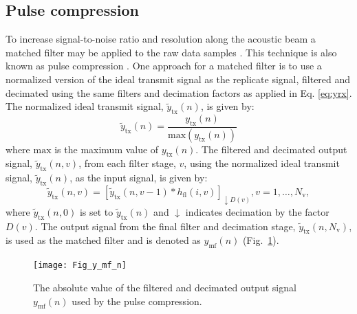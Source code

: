 \documentclass[preprint,12pt,TurnOnLineNumbers]{JASAnew}
\newcommand{\samplesymt}{n}
\newcommand{\genidxsym}{i}
\newcommand{\stagesym}{v}
\newcommand{\nstages}{N_{\textrm{v}}}
\newcommand{\ytx}{y_{\textrm{tx}}}
\newcommand{\ytxnorm}{\tilde{y}_{\textrm{tx}}}
\newcommand{\ymf}{y_{\textrm{mf}}}
\newcommand{\decfac}{D}
\newcommand{\hfl}{h_{\textrm{fl}}}
\begin{document}
\subsection{Pulse compression}
To increase signal-to-noise ratio and resolution along the acoustic beam a matched filter may be applied to the raw data samples \citep{turin1960}. This technique is also known as pulse compression \citep{klauder1960}. One approach for a matched filter is to use a normalized version of the ideal transmit signal as the replicate signal, filtered and decimated using the same filters and decimation factors as applied in Eq. \ref{eq:yrx}. The normalized ideal transmit signal, $\ytxnorm(\samplesymt)$, is given by:
%
\begin{equation}
\label{eq:ytxnorm}
\ytxnorm(\samplesymt) = \frac{\ytx(\samplesymt)}{\textrm{max}(\ytx(\samplesymt))}\end{equation}
%
where $\textrm{max}$ is the maximum value of $\ytx(\samplesymt)$. The filtered and decimated output signal, $\ytxnorm(\samplesymt,\stagesym)$, from each filter stage, $\stagesym$, using the normalized ideal transmit signal, $\ytxnorm(\samplesymt)$, as the input signal, is given by:
%
\begin{equation}
\label{eq:FilterStagesTX}
\ytxnorm(\samplesymt,\stagesym) = \left[ \ytxnorm(\samplesymt,\stagesym-1) * \hfl(\genidxsym,\stagesym) \right]_{\downarrow \decfac(\stagesym)}, 
\stagesym = 1,\ldots,\nstages,
\end{equation}
%
where $\ytxnorm(\samplesymt,0)$ is set to $\ytxnorm(\samplesymt)$ and $\downarrow$ indicates decimation by the factor $\decfac(\stagesym)$. The output signal from the final filter and decimation stage, $\ytxnorm(\samplesymt,\nstages)$, is used as the matched filter and is denoted as $\ymf(\samplesymt)$  (Fig.~\ref{fi:y_mf_n}).
%
\begin{figure}
\texttt{[image: Fig\_y\_mf\_n]}
\caption{\label{fi:y_mf_n} The absolute value of the filtered and decimated output signal $\ymf(\samplesymt)$ used by the pulse compression.}
\end{figure}
\end{document}
